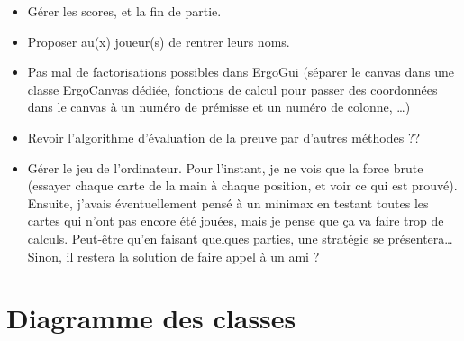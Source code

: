 \documentclass[12pt, algo]{cours}
\begin{document}
\begin{itemize}
\item Gérer les scores, et la fin de partie.
\item Proposer au(x) joueur(s) de rentrer leurs noms.
\item Pas mal de factorisations possibles dans ErgoGui (séparer le canvas dans une classe ErgoCanvas dédiée, fonctions de calcul pour passer des coordonnées dans le canvas à un numéro de prémisse et un numéro de colonne, \dots)
\item Revoir l'algorithme d'évaluation de la preuve par d'autres méthodes ??
\item Gérer le jeu de l'ordinateur.  Pour l'instant, je ne vois que la force brute (essayer chaque carte de la main à chaque position, et voir ce qui est prouvé). Ensuite, j'avais éventuellement pensé à un minimax en testant toutes les cartes qui n'ont pas encore été jouées, mais je pense que ça va faire trop de calculs. Peut-être qu'en faisant quelques parties, une stratégie se présentera\dots Sinon, il restera la solution de faire appel à un ami ?
\end{itemize}

\appendix

\section{Diagramme des classes}


\end{document}
